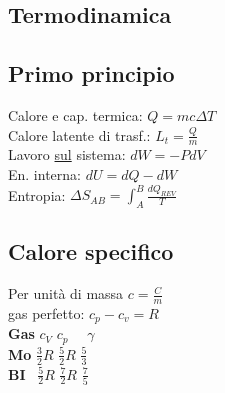 \documentclass[8pt]{scrreprt}
\begin{document}
\begin{multicols*}{3}
\vspace{-3mm}
\section*{Termodinamica}
\vspace{-3mm}
\subsection*{Primo principio}
Calore e cap. termica: $Q = mc \Delta T$\\ %
Calore latente di trasf.: $L_t = \frac{Q}{m}$\\
Lavoro \underline{sul} sistema: $dW = -PdV$\\
En. interna: $dU = dQ - dW$\\
Entropia: $\Delta S_{AB} = \int_A^B \frac{dQ_{REV}}{T}$

\vspace{-3mm}
\subsection*{Calore specifico}
Per unità di massa $c = \frac{C}{m}$\\
gas perfetto: $c_p - c_v = R$\\
\textbf{Gas} \quad \textbf{\(c_V\)} \quad \textbf{\(c_p\)} \quad \ \ \textbf{\(\gamma\)} \\
\textbf{Mo} \quad \(\frac{3}{2}R\) \quad \(\frac{5}{2}R\) \quad \(\frac{5}{3}\) \\
\textbf{BI}  \quad \ \(\frac{5}{2}R\) \quad \(\frac{7}{2}R\) \quad \(\frac{7}{5}\) \\


\vspace{-3mm}

\end{multicols*}
\end{document}
